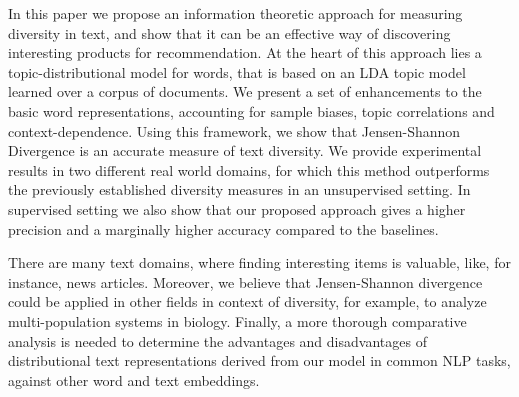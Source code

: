 In this paper we propose an information theoretic approach for
measuring diversity in text, and show that it can be an effective way
of discovering interesting products for recommendation. At the heart
of this approach lies a 
topic-distributional model for words, that is based on an LDA topic
model learned over a corpus of documents. We present a set of
enhancements to the 
basic word representations, accounting for sample
biases, topic correlations and context-dependence. Using this framework,
we show that Jensen-Shannon Divergence is an accurate measure of text
diversity. We provide experimental results in two different real 
world domains, for which this method outperforms the previously
established diversity measures in an unsupervised setting. In
supervised setting we also show that our proposed approach gives a
higher precision and a marginally higher accuracy compared to the
baselines.

There are many text domains, where finding interesting items is valuable, 
like, for instance, news articles. Moreover, we believe that Jensen-Shannon 
divergence could be applied in other fields in context of diversity, for example, 
to analyze multi-population systems in biology. Finally, a more
thorough comparative analysis  
is needed to determine the advantages and disadvantages of distributional text 
representations derived from our model in common NLP tasks, 
against other word and text embeddings.

 